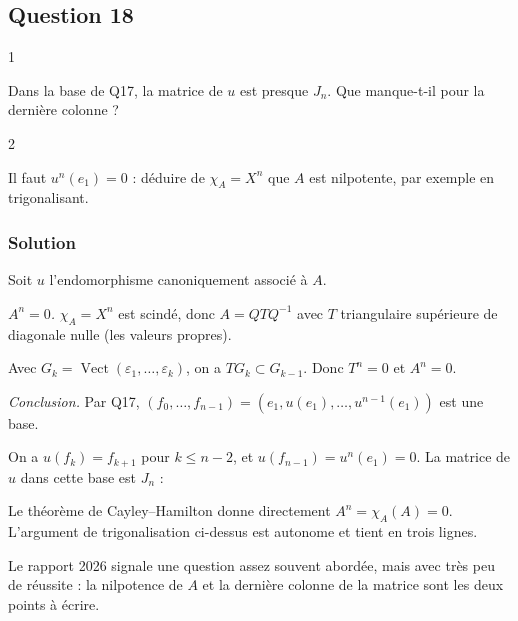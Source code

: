 \documentclass[11pt,a4paper]{article}
\newcommand{\equationajustee}[1]{%
  \sbox{\boiteequation}{$\displaystyle #1$}%
  \ifdim\wd\boiteequation>\linewidth
    \[\resizebox{\linewidth}{!}{\usebox{\boiteequation}}\]%
  \else
    \[#1\]%
  \fi}
\begin{document}
\hypertarget{question-18}{%
\subsection{Question 18}\label{question-18}}

\begin{indication}{1}

Dans la base de Q17, la matrice de \(u\) est presque \(J_n\). Que manque-t-il pour la dernière colonne ?

\end{indication}

\begin{indication}{2}

Il faut \(u^n(e_1)=0\) : déduire de \(\chi_A=X^n\) que \(A\) est nilpotente, par exemple en trigonalisant.

\end{indication}

\hypertarget{solution-17}{%
\subsubsection{Solution}\label{solution-17}}

Soit \(u\) l'endomorphisme canoniquement associé à \(A\).

\emph{\(A^n=0\).} \(\chi_A=X^n\) est scindé, donc \(A=QTQ^{-1}\) avec \(T\) triangulaire supérieure de diagonale nulle (les valeurs propres).

Avec \(G_k=\operatorname{Vect}(\varepsilon_1,\dots,\varepsilon_k)\), on a \(TG_k\subset G_{k-1}\). Donc \(T^n=0\) et \(A^n=0\).

\emph{Conclusion.} Par Q17, \((f_0,\dots,f_{n-1})=(e_1,u(e_1),\dots,u^{n-1}(e_1))\) est une base.

On a \(u(f_k)=f_{k+1}\) pour \(k\leqslant n-2\), et \(u(f_{n-1})=u^n(e_1)=0\). La matrice de \(u\) dans cette base est \(J_n\) :

\equationajustee{\boxed{A\text{ est semblable \text{à} }J_n.}}

\begin{methode}

Le théorème de Cayley--Hamilton donne directement \(A^n=\chi_A(A)=0\). L'argument de trigonalisation ci-dessus est autonome et tient en trois lignes.

\end{methode}

\begin{jury}

Le rapport 2026 signale une question assez souvent abordée, mais avec très peu de réussite : la nilpotence de \(A\) et la dernière colonne de la matrice sont les deux points à écrire.

\end{jury}
\end{document}
